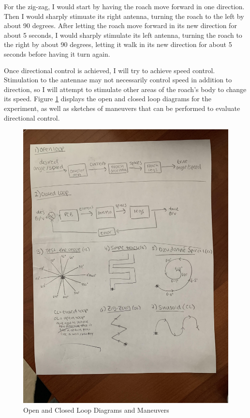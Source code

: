 For the zig-zag, I would start by having the roach move forward in one direction. Then I would sharply stimuate its right antenna, turning the roach to the left by about 90 degrees. After letting the roach move forward in its new direction for about 5 seconds, I would sharply stimulate its left antenna, turning the roach to the right by about 90 degrees, letting it walk in its new direction for about 5 seconds before having it turn again.

Once directional control is achieved, I will try to achieve speed control. Stimulation to the antennae may not necessarily control speed in addition to direction, so I will attempt to stimulate other areas of the roach's body to change its speed. Figure \ref{fig:rough} displays the open and closed loop diagrams for the experiment, as well as sketches of maneuvers that can be performed to evaluate directional control.

{\begin{figure}[ht!]
\centering
\includegraphics[scale=0.1]{Figures/OpenClosedLoops.jpg}
\caption{Open and Closed Loop Diagrams and Maneuvers}
\label{fig:rough}
\end{figure}}


 
